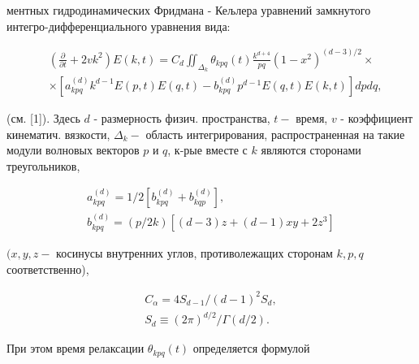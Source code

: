 \documentclass[10pt]{article}
\begin{document}
ментных гидродинамических Фридмана - Кељлера уравнений замкнутого интегро-дифференциального уравнения вида:



\[

\begin{aligned}

& \left(\frac{\partial}{\partial t}+2 v k^{2}\right) E(k, t)=C_{d} \iint_{\Delta_{k}} \theta_{k p q}(t) \frac{k^{d+4}}{p q}\left(1-x^{2}\right)^{(d-3) / 2} \times \\

& \times\left[a_{k p q}^{(d)} k^{d-1} E(p, t) E(q, t)-b_{k p q}^{(d)} p^{d-1} E(q, t) E(k, t)\right] d p d q,

\end{aligned}

\]



(см. [1]). Здесь $d$ - размерность физич. пространства, $t-$ время, $v$ - коэффициент кинематич. вязкости, $\Delta_{k}-$ область интегрирования, распространенная на такие модули волновых векторов $p$ и $q$, к-рые вместе с $k$ являются сторонами треугольников,



\[

\begin{gathered}

a_{k p q}^{(d)}=1 / 2\left[b_{k p q}^{(d)}+b_{k q p}^{(d)}\right], \\

b_{k p q}^{(d)}=(p / 2 k)\left[(d-3) z+(d-1) x y+2 z^{3}\right]

\end{gathered}

\]



$(x, y, z-$ косинусы внутренних углов, противолежащих сторонам $k, p, q$ соответственно),



\[

\begin{gathered}

C_{\alpha}=4 S_{d-1} /(d-1)^{2} S_{d}, \\

S_{d} \equiv(2 \pi)^{d / 2} / \Gamma(d / 2) .

\end{gathered}

\]



При этом время релаксации $\theta_{k p q}(t)$ определяется формулой
\end{document}
